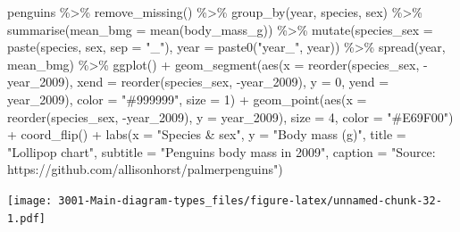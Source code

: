 \documentclass[
]{book}
\newenvironment{Shaded}{\begin{snugshade}}{\end{snugshade}}
\newcommand{\AttributeTok}[1]{\textcolor[rgb]{0.77,0.63,0.00}{#1}}
\newcommand{\DecValTok}[1]{\textcolor[rgb]{0.00,0.00,0.81}{#1}}
\newcommand{\FunctionTok}[1]{\textcolor[rgb]{0.00,0.00,0.00}{#1}}
\newcommand{\NormalTok}[1]{#1}
\newcommand{\SpecialCharTok}[1]{\textcolor[rgb]{0.00,0.00,0.00}{#1}}
\newcommand{\StringTok}[1]{\textcolor[rgb]{0.31,0.60,0.02}{#1}}
\begin{document}
\begin{Shaded}
\begin{Highlighting}[]
\NormalTok{penguins }\SpecialCharTok{\%\textgreater{}\%}
    \FunctionTok{remove\_missing}\NormalTok{() }\SpecialCharTok{\%\textgreater{}\%}
    \FunctionTok{group\_by}\NormalTok{(year, species, sex) }\SpecialCharTok{\%\textgreater{}\%}
    \FunctionTok{summarise}\NormalTok{(}\AttributeTok{mean\_bmg =} \FunctionTok{mean}\NormalTok{(body\_mass\_g)) }\SpecialCharTok{\%\textgreater{}\%}
    \FunctionTok{mutate}\NormalTok{(}\AttributeTok{species\_sex =} \FunctionTok{paste}\NormalTok{(species, sex, }\AttributeTok{sep =} \StringTok{"\_"}\NormalTok{),}
         \AttributeTok{year =} \FunctionTok{paste0}\NormalTok{(}\StringTok{"year\_"}\NormalTok{, year)) }\SpecialCharTok{\%\textgreater{}\%}
    \FunctionTok{spread}\NormalTok{(year, mean\_bmg) }\SpecialCharTok{\%\textgreater{}\%}
    \FunctionTok{ggplot}\NormalTok{() }\SpecialCharTok{+}
    \FunctionTok{geom\_segment}\NormalTok{(}\FunctionTok{aes}\NormalTok{(}\AttributeTok{x =} \FunctionTok{reorder}\NormalTok{(species\_sex, }\SpecialCharTok{{-}}\NormalTok{year\_2009), }\AttributeTok{xend =} \FunctionTok{reorder}\NormalTok{(species\_sex, }\SpecialCharTok{{-}}\NormalTok{year\_2009), }
                   \AttributeTok{y =} \DecValTok{0}\NormalTok{, }\AttributeTok{yend =}\NormalTok{ year\_2009),}
                 \AttributeTok{color =} \StringTok{"\#999999"}\NormalTok{, }\AttributeTok{size =} \DecValTok{1}\NormalTok{) }\SpecialCharTok{+}
    \FunctionTok{geom\_point}\NormalTok{(}\FunctionTok{aes}\NormalTok{(}\AttributeTok{x =} \FunctionTok{reorder}\NormalTok{(species\_sex, }\SpecialCharTok{{-}}\NormalTok{year\_2009), }\AttributeTok{y =}\NormalTok{ year\_2009),}
               \AttributeTok{size =} \DecValTok{4}\NormalTok{, }\AttributeTok{color =} \StringTok{"\#E69F00"}\NormalTok{) }\SpecialCharTok{+}
    \FunctionTok{coord\_flip}\NormalTok{() }\SpecialCharTok{+}
      \FunctionTok{labs}\NormalTok{(}\AttributeTok{x =} \StringTok{"Species \& sex"}\NormalTok{, }
           \AttributeTok{y =} \StringTok{"Body mass (g)"}\NormalTok{,}
          \AttributeTok{title =} \StringTok{"Lollipop chart"}\NormalTok{, }
          \AttributeTok{subtitle =} \StringTok{"Penguin\textquotesingle{}s body mass in 2009"}\NormalTok{,}
          \AttributeTok{caption =} \StringTok{"Source: https://github.com/allisonhorst/palmerpenguins"}\NormalTok{)}
\end{Highlighting}
\end{Shaded}

\texttt{[image: 3001-Main-diagram-types\_files/figure-latex/unnamed-chunk-32-1.pdf]}
\end{document}

